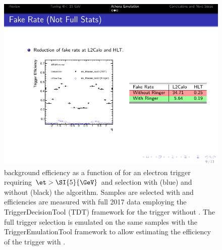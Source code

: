 \begin{figure}[b]
  \centering
  \includegraphics[width=.5\textwidth]{appendices/figures/low_et/e5_lhloose_eta_bkg}
  \caption{\label{fig:lowet_e5_lhloose_bkg}
\fastcalo{} background efficiency as a function of \eta{} for an electron
trigger requiring $\et > \SI{5}{\GeV}$ and \loose selection with (blue) and
without (black) the \rnn algorithm. Samples are selected with \Jee{} \tnp{} and
efficiencies are measured with full 2017 data employing the TriggerDecisionTool
(TDT) framework for the trigger without \rnn{}. The full trigger selection is
emulated on the same samples with the TriggerEmulationTool framework to allow
estimating the efficiency of the trigger with \rnn{}.
}
\end{figure}

